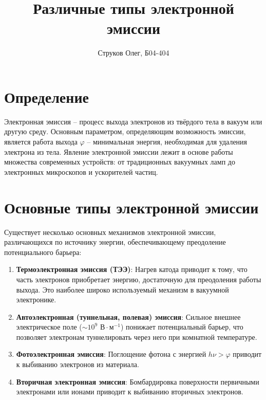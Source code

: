 \documentclass[12pt]{article}
\author{Струков Олег, Б04-404}
\title{Различные типы электронной эмиссии}
\date{}
\begin{document}
\maketitle

\section*{Определение}
Электронная эмиссия -- процесс выхода электронов из твёрдого тела в вакуум или другую среду. Основным параметром, определяющим возможность эмиссии, является работа выхода $\varphi$ -- минимальная энергия, необходимая для удаления электрона из тела. Явление электронной эмиссии лежит в основе работы множества современных устройств: от традиционных вакуумных ламп до электронных микроскопов и ускорителей частиц. 



\section*{Основные типы электронной эмиссии}
Существует несколько основных механизмов электронной эмиссии, различающихся по источнику энергии, обеспечивающему преодоление потенциального барьера:

\begin{enumerate}
    \item \textbf{Термоэлектронная эмиссия (ТЭЭ)}: Нагрев катода приводит к тому, что часть электронов приобретает энергию, достаточную для преодоления работы выхода. Это наиболее широко используемый механизм в вакуумной электронике.
    
    \item \textbf{Автоэлектронная (туннельная, полевая) эмиссия}: Сильное внешнее электрическое поле ($\sim 10^9 \text{ В}\cdot\text{м}^{-1}$) понижает потенциальный барьер, что позволяет электронам туннелировать через него при комнатной температуре.
    
    \item \textbf{Фотоэлектронная эмиссия}: Поглощение фотона с энергией $h\nu > \varphi$ приводит к выбиванию электронов из материала.
    
    \item \textbf{Вторичная электронная эмиссия}: Бомбардировка поверхности первичными электронами или ионами приводит к выбиванию вторичных электронов.
\end{enumerate}
\end{document}
